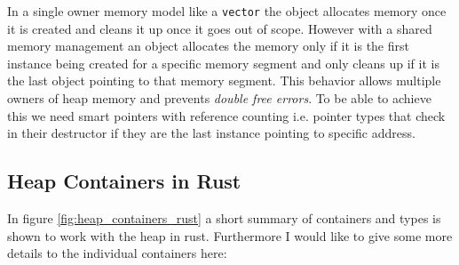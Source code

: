     In a single owner memory model like a \lstinline{vector} the object allocates memory once it is created and cleans it up once it goes out of scope. However with a shared memory management an object allocates the memory only if it is the first instance being created for a specific memory segment and only cleans up if it is the last object pointing to that memory segment. This behavior allows multiple owners of heap memory and prevents \textit{double free errors}. To be able to achieve this we need smart pointers with reference counting i.e. pointer types that check in their destructor if they are the last instance pointing to specific address.

    \subsection{Heap Containers in Rust}

    In figure \ref{fig:heap_containers_rust} a short summary of containers and types is shown to work with the heap in rust. Furthermore I would like to give some more details to the individual containers here:


